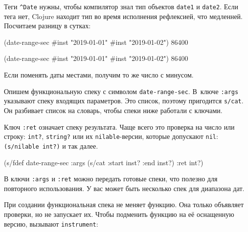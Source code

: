 \fi

Теги \verb|^Date| нужны, чтобы компилятор знал тип объектов \verb|date1| и
\verb|date2|. Если тега нет, Clojure находит тип во время исполнения
рефлексией, что медленней. Посчитаем разницу в сутках:

\ifx\DEVICETYPE\MOBILE

\begin{english}
  \begin{clojure}
(date-range-sec #inst "2019-01-01"
                #inst "2019-01-02")
86400
  \end{clojure}
\end{english}

\else

\begin{english}
  \begin{clojure}
(date-range-sec #inst "2019-01-01" #inst "2019-01-02")
86400
  \end{clojure}
\end{english}

\fi

\noindent
Если поменять даты местами, получим то же число с минусом.

Опишем функциональную спеку с символом \verb|date-range-sec|. В~ключе
\verb|:args| указывают спеку входящих параметров. Это список, поэтому пригодится
\verb|s/cat|. Он разбивает список на словарь, чтобы спеки ниже работали с
ключами.

Ключ \verb|:ret| означает спеку результата. Чаще всего это проверка на число или
строку: \verb|int?|, \verb|string?| или их \verb|nilable|-версии, которые
допускают \verb|nil|: \verb|(s/nilable int?)| и так далее.


\begin{english}
  \begin{clojure}
(s/fdef date-range-sec
  :args (s/cat :start inst? :end inst?)
  :ret int?)
  \end{clojure}
\end{english}

В ключи \verb|:args| и \verb|:ret| можно передать готовые спеки, что полезно
для повторного использования. У вас может быть несколько спек для диапазона дат.

При создании функциональная спека не меняет функцию. Она только объявляет
проверки, но не запускает их. Чтобы подменить функцию на её оснащенную версию,
вызывают \verb|instrument|:

\ifx\DEVICETYPE\MOBILE

